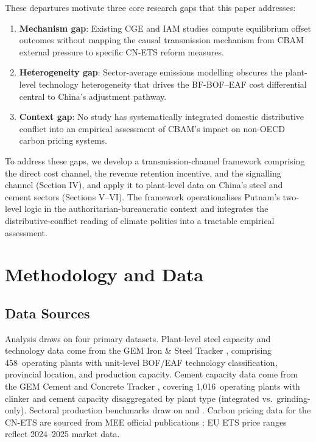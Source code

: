 \documentclass[letterpaper, 10pt, conference]{ieeeconf}
\begin{document}
These departures motivate three core research gaps that this paper addresses:
\begin{enumerate}
    \item \textbf{Mechanism gap}: Existing CGE and IAM studies compute equilibrium offset outcomes without mapping the causal transmission mechanism from CBAM external pressure to specific CN-ETS reform measures.
    \item \textbf{Heterogeneity gap}: Sector-average emissions modelling obscures the plant-level technology heterogeneity that drives the BF-BOF--EAF cost differential central to China's adjustment pathway.
    \item \textbf{Context gap}: No study has systematically integrated domestic distributive conflict into an empirical assessment of CBAM's impact on non-OECD carbon pricing systems.
\end{enumerate}

To address these gaps, we develop a transmission-channel framework comprising the direct cost channel, the revenue retention incentive, and the signalling channel (Section IV), and apply it to plant-level data on China's steel and cement sectors (Sections V--VI). The framework operationalises Putnam's two-level logic in the authoritarian-bureaucratic context and integrates the distributive-conflict reading of climate politics into a tractable empirical assessment.


\section{Methodology and Data}

\subsection{Data Sources}

Analysis draws on four primary datasets. Plant-level steel capacity and
technology data come from the GEM Iron \& Steel Tracker \citep{GEM_Steel2026},
comprising 458~operating plants with unit-level BOF/EAF technology
classification, provincial location, and production capacity. Cement
capacity data come from the GEM Cement and Concrete Tracker
\citep{GEM_Cement2025}, covering 1,016~operating plants with clinker
and cement capacity disaggregated by plant type (integrated
vs.\ grinding-only). Sectoral production benchmarks draw on
\citet{IEA2023} and \citet{WorldSteel2024}. Carbon pricing data for
the CN-ETS are sourced from MEE official publications
\citep{MEE2021, MEE2023}; EU ETS price ranges reflect 2024--2025
market data.
\end{document}
